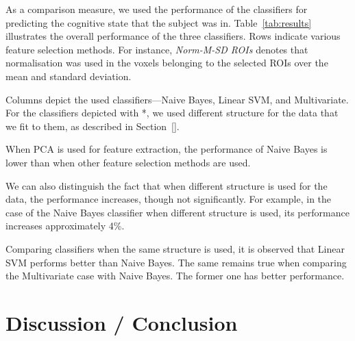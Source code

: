 \documentclass[preprint,journal,11pt]{vgtc}
\begin{document}
As a comparison measure, we used the performance of the classifiers for predicting the cognitive state that the subject was in. Table~\ref{tab:results} illustrates the overall performance of the three classifiers. Rows indicate various feature selection methods. For instance, \emph{Norm-M-SD ROIs} denotes that normalisation was used in the voxels belonging to the selected ROIs over the mean and standard deviation.



Columns depict the used classifiers---Naive Bayes, Linear SVM, and Multivariate. For the classifiers depicted with *, we used different structure for the data that we fit to them, as described in Section~\ref{}.

When PCA is used for feature extraction, the performance of Naive Bayes is lower than when other feature selection methods are used. 

We can also distinguish the fact that when different structure is used for the data, the performance increases, though not significantly. For example, in the case of the Naive Bayes classifier when different structure is used, its performance increases approximately 4\%.

Comparing classifiers when the same structure is used, it is observed that Linear SVM performs better than Naive Bayes. The same remains true when comparing the Multivariate case with Naive Bayes. The former one has better performance.



\section{Discussion / Conclusion}
\label{sec:discussion}


\nocite{*}

\end{document}
